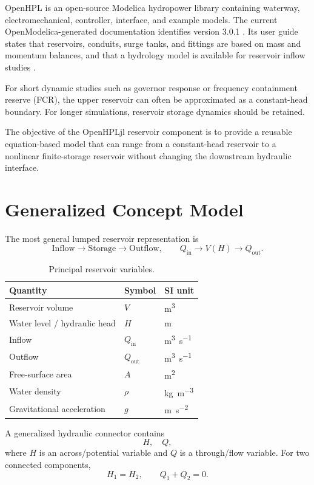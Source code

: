 \documentclass[11pt,a4paper]{article}
\begin{document}
OpenHPL is an open-source Modelica hydropower library containing waterway, electromechanical, controller, interface, and example models. The current OpenModelica-generated documentation identifies version 3.0.1 \cite{OpenHPLDocs}. Its user guide states that reservoirs, conduits, surge tanks, and fittings are based on mass and momentum balances, and that a hydrology model is available for reservoir inflow studies \cite{OpenHPLUserGuide}.

For short dynamic studies such as governor response or frequency containment reserve (FCR), the upper reservoir can often be approximated as a constant-head boundary. For longer simulations, reservoir storage dynamics should be retained.

The objective of the OpenHPLjl reservoir component is to provide a reusable equation-based model that can range from a constant-head reservoir to a nonlinear finite-storage reservoir without changing the downstream hydraulic interface.

\section{Generalized Concept Model}
The most general lumped reservoir representation is
\[
\boxed{\text{Inflow}\rightarrow\text{Storage}\rightarrow\text{Outflow}},
\qquad
Q_{\mathrm{in}}\rightarrow V(H)\rightarrow Q_{\mathrm{out}}.
\]

\begin{table}[ht]
\centering
\caption{Principal reservoir variables.}
\begin{tabular}{lll}
\toprule
Quantity & Symbol & SI unit \\
\midrule
Reservoir volume & $V$ & \si{\meter\cubed} \\
Water level / hydraulic head & $H$ & \si{\meter} \\
Inflow & $Q_{\mathrm{in}}$ & \si{\meter\cubed\per\second} \\
Outflow & $Q_{\mathrm{out}}$ & \si{\meter\cubed\per\second} \\
Free-surface area & $A$ & \si{\meter\squared} \\
Water density & $\rho$ & \si{\kilogram\per\meter\cubed} \\
Gravitational acceleration & $g$ & \si{\meter\per\second\squared} \\
\bottomrule
\end{tabular}
\end{table}

A generalized hydraulic connector contains
\[
\boxed{H,\quad Q},
\]
where $H$ is an across/potential variable and $Q$ is a through/flow variable. For two connected components,
\[
H_1=H_2,\qquad Q_1+Q_2=0.
\]
\end{document}
